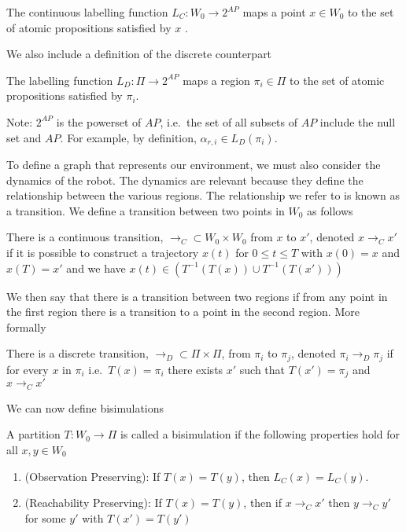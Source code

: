 \theoremstyle{definition}
\begin{definition}
\label{defCLF}
The continuous labelling function $L_C:W_0 \rightarrow 2^{AP}$ maps a point $x \in W_0$ to the set of atomic propositions satisfied by $x$ \cite{guo15}.
\end{definition} 

We also include a definition of the discrete counterpart 

\theoremstyle{definition}
\begin{definition}
\label{defDLF}
The labelling function $L_D:\Pi\rightarrow 2^{AP}$ maps a region $\pi_i \in \Pi$ to the set of atomic propositions satisfied by $\pi_i$.
\end{definition} 
Note: $2^{AP}$ is the powerset of $AP$, i.e.\ the set of all subsets of $AP$ include the null set and $AP$. For example, by definition, $\alpha_{r,i} \in L_D(\pi_i)$. 

To define a graph that represents our environment, we must also consider the dynamics of the robot. The dynamics are relevant because they define the relationship between the various regions. The relationship we refer to is known as a transition. We define a transition between two points in $W_0$ as follows
\theoremstyle{definition}
\begin{definition}
\label{defCTransition}
There is a continuous transition, $\rightarrow_C \subset W_0 \times W_0$ from $x$ to $x'$, denoted $x \rightarrow_C x'$ if it is possible to construct a trajectory $x(t)$ for $0 \leq t \leq T$ with $x(0)=x$ and $x(T) =x'$ and we have $x(t) \in (T^{-1}(T(x))\cup T^{-1}(T(x')))$ \cite{fainekos09}
\end{definition}

We then say that there is a transition between two regions if from any point in the first region there is a transition to a point in the second region. More formally

\theoremstyle{definition}
\begin{definition}
\label{defDTransition}
There is a discrete transition, $\rightarrow_D \subset \Pi \times \Pi$, from $\pi_i$ to $\pi_j$, denoted $\pi_i \rightarrow_D \pi_j$ if for every $x$ in $\pi_i$ i.e.\ $T(x) = \pi_i$ there exists $x'$ such that $T(x')=\pi_j$ and $x \rightarrow_C x'$
\end{definition}

We can now define bisimulations
\theoremstyle{definition}
\begin{definition}
\label{def:bisim}
A partition $T:W_0\rightarrow \Pi$ is called a bisimulation \cite{fainekos09} if the following properties hold for all $x,y \in W_0$
\begin{enumerate}
    \item (Observation Preserving): If $T(x)=T(y)$, then $L_C(x) = L_C(y)$.
    \item (Reachability Preserving): If $T(x) = T(y)$, then if $x\rightarrow_C x'$ then $y \rightarrow_C y'$ for some $y'$ with $T(x')=T(y')$
\end{enumerate}
\end{definition}

